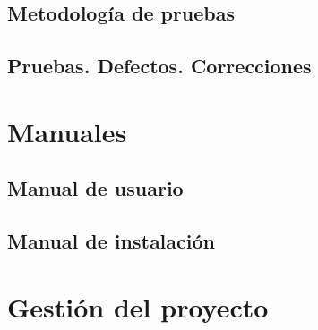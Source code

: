 \documentclass[10pt,spanish]{article}
\let\stdsection\section
\renewcommand\section{\newpage\stdsection}
\begin{document}
\subsection{Metodología de pruebas}


\subsection{Pruebas. Defectos. Correcciones}



\section{Manuales}


\subsection{Manual de usuario}


\subsection{Manual de instalación}



\section{Gestión del proyecto}

\end{document}
